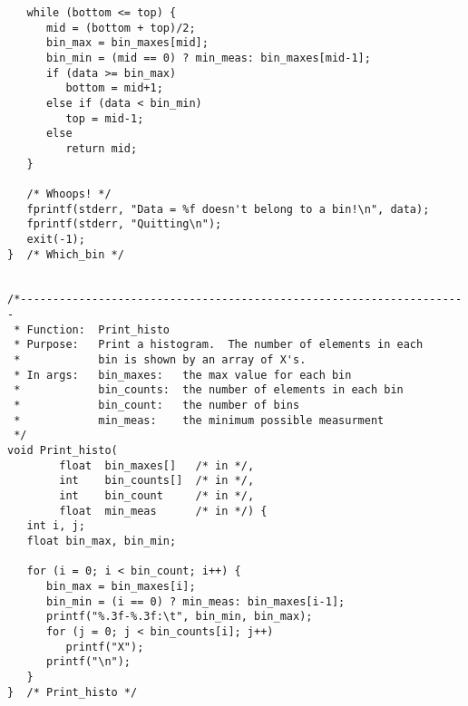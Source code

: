 \documentclass[a4paper,11pt,twoside]{article}
\begin{document}
\begin{verbatim}
   while (bottom <= top) {
      mid = (bottom + top)/2;
      bin_max = bin_maxes[mid];
      bin_min = (mid == 0) ? min_meas: bin_maxes[mid-1];
      if (data >= bin_max) 
         bottom = mid+1;
      else if (data < bin_min)
         top = mid-1;
      else
         return mid;
   }

   /* Whoops! */
   fprintf(stderr, "Data = %f doesn't belong to a bin!\n", data);
   fprintf(stderr, "Quitting\n");
   exit(-1);
}  /* Which_bin */


/*---------------------------------------------------------------------
 * Function:  Print_histo
 * Purpose:   Print a histogram.  The number of elements in each
 *            bin is shown by an array of X's.
 * In args:   bin_maxes:   the max value for each bin
 *            bin_counts:  the number of elements in each bin
 *            bin_count:   the number of bins
 *            min_meas:    the minimum possible measurment
 */
void Print_histo(
        float  bin_maxes[]   /* in */, 
        int    bin_counts[]  /* in */, 
        int    bin_count     /* in */, 
        float  min_meas      /* in */) {
   int i, j;
   float bin_max, bin_min;

   for (i = 0; i < bin_count; i++) {
      bin_max = bin_maxes[i];
      bin_min = (i == 0) ? min_meas: bin_maxes[i-1];
      printf("%.3f-%.3f:\t", bin_min, bin_max);
      for (j = 0; j < bin_counts[i]; j++)
         printf("X");
      printf("\n");
   }
}  /* Print_histo */

\end{verbatim}



\end{document}
